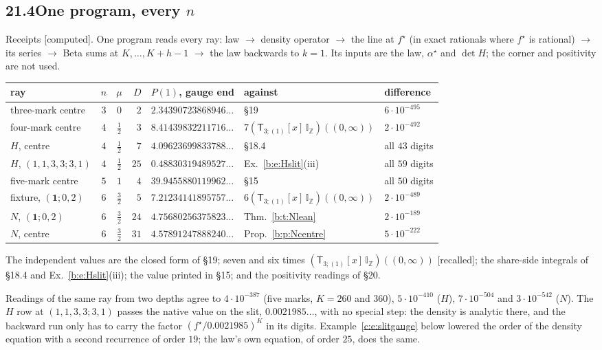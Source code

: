 \documentclass[11pt]{article}
\newcommand{\one}{\mathbf 1}
\newcommand{\sT}{\mathsf T}
\newcommand{\IZ}{\mathbb I_{\mathbb Z}}
\newcommand{\Tx}[3]{(\sT_{#1;(1)}[x]\,#2)((#3,\infty))}
\newcommand{\Zt}{\Tx3{\IZ}0}
\theoremstyle{plain}
\theoremstyle{definition}
\theoremstyle{remark}
\newcommand{\computed}{\textup{[computed]}}
\newcommand{\recalled}{\textup{[recalled]}}
\begin{document}
\subsection*{21.4\quad One program, every $n$}

Receipts \computed. One program reads every ray: law $\to$ density operator $\to$ the line at $f^\star$ (in exact rationals where $f^\star$ is rational) $\to$ its series $\to$ Beta sums at $K,\dots,K+h-1$ $\to$ the law backwards to $k=1$. Its inputs are the law, $\alpha^\star$ and $\det H$; the corner and positivity are not used.
\begin{center}
\small
\setlength{\tabcolsep}{4pt}
\begin{tabular}{@{}l c c r l l l@{}}
\toprule
ray & $n$ & $\mu$ & $D$ & $P(1)$, gauge end & against & difference\\ \midrule
three-mark centre & $3$ & $0$ & $2$ & $2.34390723868946\ldots$ & \S19 & $6\cdot10^{-495}$\\
four-mark centre & $4$ & $\frac12$ & $3$ & $8.41439832211716\ldots$ & $7\Zt$ & $2\cdot10^{-492}$\\
$H$, centre & $4$ & $\frac12$ & $7$ & $4.09623699833788\ldots$ & \S18.4 & all $43$ digits\\
$H$, $(1,1,3,3;3,1)$ & $4$ & $\frac12$ & $25$ & $0.48830319489527\ldots$ & Ex.~\ref{b:e:Hslit}(iii) & all $59$ digits\\
five-mark centre & $5$ & $1$ & $4$ & $39.9455880119962\ldots$ & \S15 & all $50$ digits\\
fixture, $(\one;0,2)$ & $6$ & $\frac32$ & $5$ & $7.21234141895757\ldots$ & $6\Zt$ & $2\cdot10^{-489}$\\
$N$, $(\one;0,2)$ & $6$ & $\frac32$ & $24$ & $4.75680256375823\ldots$ & Thm.~\ref{b:t:Nlean} & $2\cdot10^{-189}$\\
$N$, centre & $6$ & $\frac32$ & $31$ & $4.57891247888240\ldots$ & Prop.~\ref{b:p:Ncentre} & $5\cdot10^{-222}$\\
\bottomrule
\end{tabular}
\end{center}
The independent values are the closed form of \S19; seven and six times $\Zt$ \recalled; the share-side integrals of \S18.4 and Ex.~\ref{b:e:Hslit}(iii); the value printed in \S15; and the positivity readings of \S20.

Readings of the same ray from two depths agree to $4\cdot10^{-387}$ (five marks, $K=260$ and $360$), $5\cdot10^{-410}$ ($H$), $7\cdot10^{-504}$ and $3\cdot10^{-542}$ ($N$). The $H$ row at $(1,1,3,3;3,1)$ passes the native value on the slit, $0.0021985\ldots$, with no special step: the density is analytic there, and the backward run only has to carry the factor $(f^\star/0.0021985)^K$ in its digits. Example~\ref{c:e:slitgauge} below lowered the order of the density equation with a second recurrence of order $19$; the law's own equation, of order $25$, does the same.
\end{document}
